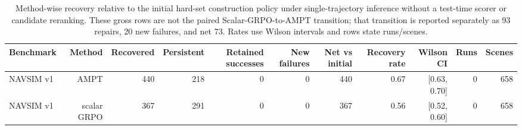 \begin{table}[t]
\centering
\small
\caption{Method-wise recovery relative to the initial hard-set construction policy under single-trajectory inference without a test-time scorer or candidate reranking. These gross rows are not the paired Scalar-GRPO-to-AMPT transition; that transition is reported separately as 93 repairs, 20 new failures, and net 73. Rates use Wilson intervals and rows state runs/scenes.}
\label{tab:supp_gross_recovery_initial}
\begin{tabular}{lrrrrrrrrrr}
\toprule
Benchmark & Method & Recovered & Persistent & Retained successes & New failures & Net vs initial & Recovery rate & Wilson CI & Runs & Scenes \\
\midrule
NAVSIM v1 & AMPT & 440 & 218 & 0 & 0 & 440 & 0.67 & [0.63, 0.70] & 0 & 658 \\
NAVSIM v1 & scalar GRPO & 367 & 291 & 0 & 0 & 367 & 0.56 & [0.52, 0.60] & 0 & 658 \\
\bottomrule
\end{tabular}
\end{table}
